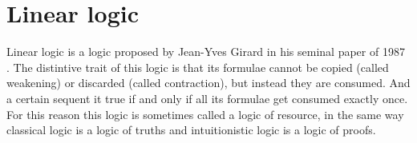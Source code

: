\documentclass[a4paper, 12pt, tesi, english]{report}
\begin{document}
% 
% 

\section{Linear logic}
Linear logic is a logic proposed by Jean-Yves Girard in his seminal paper of 1987 \cite{LinearLogic}.
The distintive trait of this logic is that its formulae cannot be copied (called weakening) or discarded (called contraction), but instead they are consumed.
And a certain sequent it true if and only if all its formulae get consumed exactly once.
For this reason this logic is sometimes called a logic of resource, in the same way classical logic is a logic of truths and intuitionistic logic is a logic of proofs.
\end{document}
